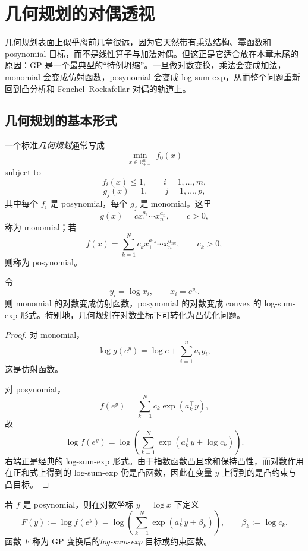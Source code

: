 \section{几何规划的对偶透视}

\label{sec:8-4}

几何规划表面上似乎离前几章很远，因为它天然带有乘法结构、幂函数和 posynomial 目标，而不是线性算子与加法对偶。但这正是它适合放在本章末尾的原因：GP 是一个最典型的“特例坍缩”。一旦做对数变换，乘法会变成加法，monomial 会变成仿射函数，posynomial 会变成 log-sum-exp，从而整个问题重新回到凸分析和 Fenchel--Rockafellar 对偶的轨道上。

\subsection{几何规划的基本形式}

\begin{definition}[几何规划]\label{def:geometric-program}
一个标准\emph{几何规划}通常写成
\[
\min_{x\in \mathbb R_{++}^n}\ f_0(x)
\]
subject to
\[
f_i(x)\le 1,\qquad i=1,\dots,m,
\]
\[
g_j(x)=1,\qquad j=1,\dots,p,
\]
其中每个 $f_i$ 是 posynomial，每个 $g_j$ 是 monomial。这里
\[
g(x)=c x_1^{a_1}\cdots x_n^{a_n},\qquad c>0,
\]
称为 monomial；若
\[
f(x)=\sum_{k=1}^N c_k x_1^{a_{1k}}\cdots x_n^{a_{nk}},\qquad c_k>0,
\]
则称为 posynomial。
\end{definition}

\begin{proposition}[对数变换后的凸性]\label{prop:gp-log-transform-convexity}
令
\[
y_i=\log x_i,\qquad x_i=e^{y_i}.
\]
则 monomial 的对数变成仿射函数，posynomial 的对数变成 convex 的 log-sum-exp 形式。特别地，几何规划在对数坐标下可转化为凸优化问题。
\end{proposition}

\begin{proof}
对 monomial，
\[
\log g(e^y)=\log c+\sum_{i=1}^n a_i y_i,
\]
这是仿射函数。

对 posynomial，
\[
f(e^y)=\sum_{k=1}^N c_k \exp(a_k^\top y),
\]
故
\[
\log f(e^y)=\log \left(\sum_{k=1}^N \exp(a_k^\top y+\log c_k)\right).
\]
右端正是经典的 log-sum-exp 形式。由于指数函数凸且求和保持凸性，而对数作用在正和式上得到的 log-sum-exp 仍是凸函数，因此在变量 $y$ 上得到的是凸约束与凸目标。
\end{proof}

\begin{definition}\label{def:log-sum-exp-gp}
若 $f$ 是 posynomial，则在对数坐标 $y=\log x$ 下定义
\[
F(y):=\log f(e^y)
=
\log \left(\sum_{k=1}^N \exp(a_k^\top y+\beta_k)\right),
\qquad \beta_k:=\log c_k.
\]
函数 $F$ 称为 GP 变换后的\emph{log-sum-exp} 目标或约束函数。
\end{definition}

